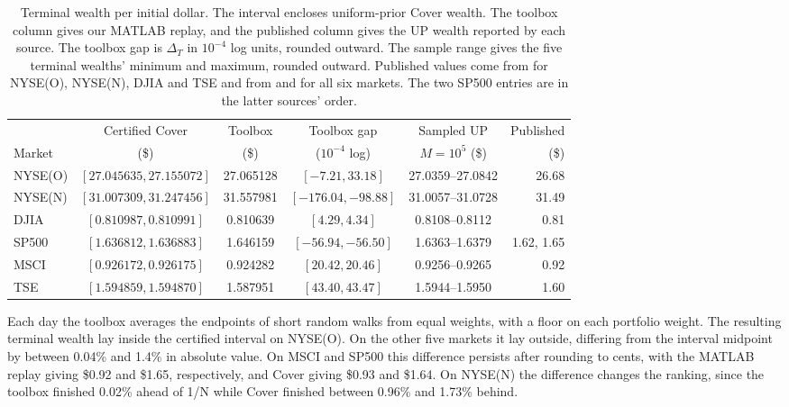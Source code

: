 \documentclass{article}
\numberwithin{equation}{section}
\theoremstyle{remark}
\begin{document}
\begin{table}[tbp]
\centering
\caption{Terminal wealth per initial dollar. The interval encloses
uniform-prior Cover wealth. The toolbox column gives our MATLAB replay,
and the published column gives the UP wealth reported by each source. The toolbox
gap is $\Delta_T$ in $10^{-4}$ log units, rounded outward. The sample range
gives the five terminal wealths' minimum and maximum, rounded outward.
Published values come from \citet[Table~1(a)]{li2012olmar} for NYSE(O),
NYSE(N), DJIA and TSE and from \citet[Table~3]{hindawi2020} and
\citet[Table~A2]{mathematics2022} for all six markets. The two SP500 entries
are in the latter sources' order.}
\label{tab:bench-audit}
\small\setlength{\tabcolsep}{4pt}
\begin{tabular}{@{}lccccr@{}}
\toprule
 & Certified Cover & Toolbox & Toolbox gap & Sampled UP & Published\\
Market & (\$) & (\$) & ($10^{-4}$ log) & $M=10^5$ (\$) & (\$)\\
\midrule
NYSE(O) & $[27.045635,27.155072]$ & 27.065128 & $[-7.21,33.18]$ & 27.0359--27.0842 & 26.68\\
NYSE(N) & $[31.007309,31.247456]$ & 31.557981 & $[-176.04,-98.88]$ & 31.0057--31.0728 & 31.49\\
DJIA & $[0.810987,0.810991]$ & 0.810639 & $[4.29,4.34]$ & 0.8108--0.8112 & 0.81\\
SP500 & $[1.636812,1.636883]$ & 1.646159 & $[-56.94,-56.50]$ & 1.6363--1.6379 & 1.62, 1.65\\
MSCI & $[0.926172,0.926175]$ & 0.924282 & $[20.42,20.46]$ & 0.9256--0.9265 & 0.92\\
TSE & $[1.594859,1.594870]$ & 1.587951 & $[43.40,43.47]$ & 1.5944--1.5950 & 1.60\\
\bottomrule
\end{tabular}
\end{table}

Each day the toolbox averages the endpoints of short random walks from
equal weights, with a floor on each portfolio weight. The resulting terminal
wealth lay inside the certified interval on NYSE(O). On the other five
markets it lay outside, differing from the interval midpoint by between
0.04\% and 1.4\% in absolute value. On MSCI and SP500 this difference
persists after rounding to cents, with the MATLAB replay giving
\$0.92 and \$1.65, respectively, and Cover giving \$0.93 and
\$1.64. On NYSE(N) the difference changes the ranking, since the
toolbox finished 0.02\% ahead of 1/N while Cover finished between
0.96\% and 1.73\% behind.
\end{document}
